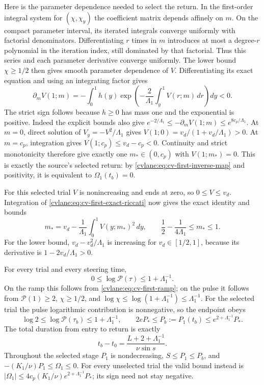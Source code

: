 Here is the parameter dependence needed to select the return.
In the first-order integral system for $(\chi,\chi_y)$ the coefficient
matrix depends affinely on $m$. On the compact parameter interval,
its iterated integrals converge uniformly with factorial denominators.
Differentiating $r$ times in $m$ introduces at most a degree-$r$
polynomial in the iteration index, still dominated by that factorial.
Thus this series and each parameter derivative converge uniformly.
The lower bound $\chi\geq1/2$ then gives smooth parameter dependence
of $V$. Differentiating its exact equation and using an integrating
factor gives
\begin{equation}
 \partial_m V(1;m)=
 -\int_0^1h(y)\exp\!\left(-\frac2{\Lambda_1}
                 \int_y^1V(r;m)\,dr\right)dy<0.
 \label{cvlane:eq:cv-first-root-derivative}
\end{equation}
The strict sign follows because $h\geq0$ has mass one and the
exponential is positive. Indeed the explicit bounds also give
$e^{-2/\Lambda_1}\leq-\partial_mV(1;m)
\leq e^{8c_p/\Lambda_1}$.
At $m=0$, direct solution of $V_y=-V^2/\Lambda_1$ gives
$V(1;0)=v_d/(1+v_d/\Lambda_1)>0$. At $m=c_p$, integration gives
$V(1;c_p)\leq v_d-c_p<0$. Continuity and strict monotonicity
therefore give exactly one $m_*\in(0,c_p)$ with $V(1;m_*)=0$.
This is exactly the source's selected return: by
\eqref{cvlane:eq:cv-first-inverse-map} and positivity, it is equivalent
to $\Omega_1(t_b)=0$.

For this selected trial $V$ is nonincreasing and ends at zero, so
$0\leq V\leq v_d$. Integration of
\eqref{cvlane:eq:cv-first-exact-riccati} now gives the exact identity and bounds
\begin{equation}
 m_*=v_d-\frac1{\Lambda_1}\int_0^1V(y;m_*)^2\,dy,
 \qquad \frac12-\frac1{4\Lambda_1}\leq m_*\leq1.
 \label{cvlane:eq:cv-first-root-bounds}
\end{equation}
For the lower bound, $v_d-v_d^2/\Lambda_1$ is increasing for
$v_d\in[1/2,1]$, because its derivative is
$1-2v_d/\Lambda_1>0$.

For every trial and every steering time,
\[
 0\leq\log\mathcal P(\tau)\leq1+\Lambda_1^{-1}.
\]
On the ramp this follows from \eqref{cvlane:eq:cv-first-ramp}; on the pulse
it follows from $\mathcal P(1)\geq2$, $\chi\geq1/2$, and
$\log\chi\leq\log(1+\Lambda_1^{-1})\leq\Lambda_1^{-1}$.
For the selected trial the pulse logarithmic contribution is
nonnegative, so the endpoint obeys
\begin{equation}
 \log2\leq\log\mathcal P(\tau_b)\leq1+\Lambda_1^{-1},\qquad
 2eP_*\leq P_b:=P_1(t_b)\leq e^{2+\Lambda_1^{-1}}P_*.
 \label{cvlane:eq:cv-first-gain}
\end{equation}
The total duration from entry to return is exactly
\begin{equation}
 t_b-t_0=\frac{L+2+\Lambda_1^{-1}}{\nu\sin s}.
 \label{cvlane:eq:cv-first-duration}
\end{equation}
Throughout the selected stage $P_1$ is nondecreasing,
$S\leq P_1\leq P_b$, and
$-(K_1/\nu)P_1\leq\Omega_1\leq0$.
For every unselected trial the valid bound instead is
$|\Omega_1|\leq4c_p(K_1/\nu)
 e^{2+\Lambda_1^{-1}}P_*$; its sign need not stay negative.

